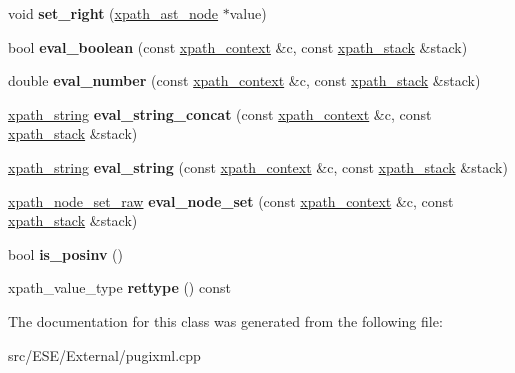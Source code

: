 \begin{DoxyCompactItemize}
\item 
\hypertarget{classxpath__ast__node_afe044146db852b7d4dbf188fd2ff6c75}{void {\bfseries set\-\_\-right} (\hyperlink{classxpath__ast__node}{xpath\-\_\-ast\-\_\-node} $\ast$value)}\label{classxpath__ast__node_afe044146db852b7d4dbf188fd2ff6c75}

\item 
\hypertarget{classxpath__ast__node_ab7f965a92023bc2704b8e6fd9f3d7c14}{bool {\bfseries eval\-\_\-boolean} (const \hyperlink{structxpath__context}{xpath\-\_\-context} \&c, const \hyperlink{structxpath__stack}{xpath\-\_\-stack} \&stack)}\label{classxpath__ast__node_ab7f965a92023bc2704b8e6fd9f3d7c14}

\item 
\hypertarget{classxpath__ast__node_a92dd7048e28d486bc7f382d1fc6f1de6}{double {\bfseries eval\-\_\-number} (const \hyperlink{structxpath__context}{xpath\-\_\-context} \&c, const \hyperlink{structxpath__stack}{xpath\-\_\-stack} \&stack)}\label{classxpath__ast__node_a92dd7048e28d486bc7f382d1fc6f1de6}

\item 
\hypertarget{classxpath__ast__node_aaf931a091af0fb91c25e90b205363b4e}{\hyperlink{classxpath__string}{xpath\-\_\-string} {\bfseries eval\-\_\-string\-\_\-concat} (const \hyperlink{structxpath__context}{xpath\-\_\-context} \&c, const \hyperlink{structxpath__stack}{xpath\-\_\-stack} \&stack)}\label{classxpath__ast__node_aaf931a091af0fb91c25e90b205363b4e}

\item 
\hypertarget{classxpath__ast__node_a6b675237a590548b68d0e0b97518b6df}{\hyperlink{classxpath__string}{xpath\-\_\-string} {\bfseries eval\-\_\-string} (const \hyperlink{structxpath__context}{xpath\-\_\-context} \&c, const \hyperlink{structxpath__stack}{xpath\-\_\-stack} \&stack)}\label{classxpath__ast__node_a6b675237a590548b68d0e0b97518b6df}

\item 
\hypertarget{classxpath__ast__node_a30d98ec97e3129e82ac9ec3f2a759855}{\hyperlink{classxpath__node__set__raw}{xpath\-\_\-node\-\_\-set\-\_\-raw} {\bfseries eval\-\_\-node\-\_\-set} (const \hyperlink{structxpath__context}{xpath\-\_\-context} \&c, const \hyperlink{structxpath__stack}{xpath\-\_\-stack} \&stack)}\label{classxpath__ast__node_a30d98ec97e3129e82ac9ec3f2a759855}

\item 
\hypertarget{classxpath__ast__node_a9253f88832441a357ea65639c73a34be}{bool {\bfseries is\-\_\-posinv} ()}\label{classxpath__ast__node_a9253f88832441a357ea65639c73a34be}

\item 
\hypertarget{classxpath__ast__node_a2c3598521141ed4b763fe6c4f852234f}{xpath\-\_\-value\-\_\-type {\bfseries rettype} () const }\label{classxpath__ast__node_a2c3598521141ed4b763fe6c4f852234f}

\end{DoxyCompactItemize}


The documentation for this class was generated from the following file\-:\begin{DoxyCompactItemize}
\item 
src/\-E\-S\-E/\-External/pugixml.\-cpp\end{DoxyCompactItemize}
